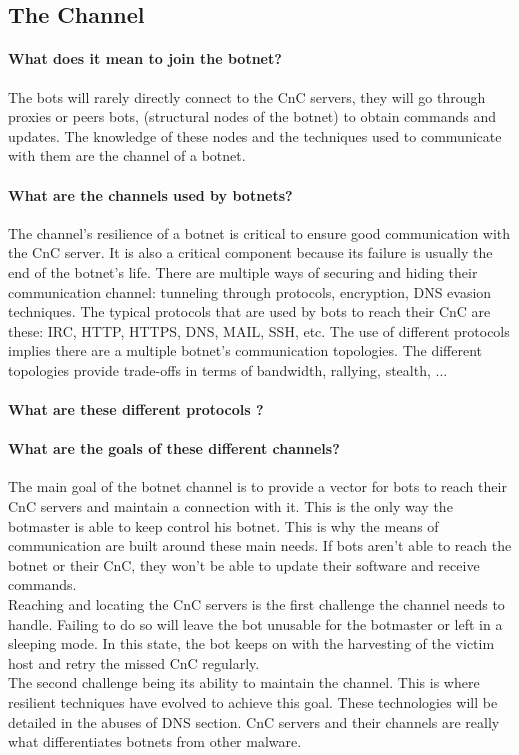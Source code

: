 \subsection{The Channel}
\paragraph{What does it mean to join the botnet?} The bots will rarely directly connect to the CnC servers, they will go through proxies or peers bots, (structural nodes of the botnet) to obtain commands and updates. The knowledge of these nodes and the techniques used to communicate with them are the channel of a botnet.
\paragraph{What are the channels used by botnets?} The channel's resilience of a botnet is critical to ensure good communication with the CnC server. It is also a critical component because its failure is usually the end of the botnet's life. There are multiple ways of securing and hiding their communication channel: tunneling through protocols, encryption, DNS evasion techniques.
\cite{bot-intro}
The typical protocols that are used by bots to reach their CnC are these: IRC, HTTP, HTTPS, DNS, MAIL, SSH, etc. The use of different protocols implies there are a multiple botnet's communication topologies. The different topologies provide trade-offs in terms of bandwidth, rallying, stealth, ...

\paragraph{What are these different protocols ?}

\paragraph{What are the goals of these different channels?}
\cite{bot-com}
The main goal of the botnet channel is to provide a vector for bots to reach their CnC servers and maintain a connection with it. This is the only way the botmaster is able to keep control his botnet. This is why the means of communication are built around these main needs. If bots aren't able to reach the botnet or their CnC, they won't be able to update their software and receive commands.\\ 
Reaching and locating the CnC servers is the first challenge the channel needs to handle. Failing to do so will leave the bot unusable for the botmaster or left in a sleeping mode. In this state, the bot keeps on with the harvesting of the victim host and retry the missed CnC regularly. \\
The second challenge being its ability to maintain the channel. This is where resilient techniques have evolved to achieve this goal. These technologies will be detailed in the abuses of DNS section. CnC servers and their channels are really what differentiates botnets from other malware. 
\cite{cont-host} %
	
